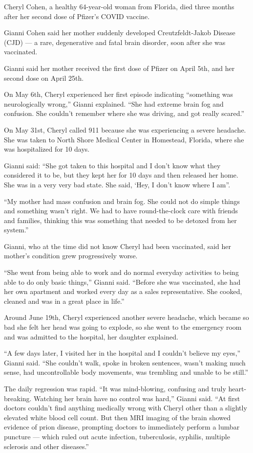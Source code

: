 Cheryl Cohen, a healthy 64-year-old woman from Florida, died three months after
her second dose of Pfizer’s COVID vaccine.

Gianni Cohen said her mother suddenly developed Creutzfeldt-Jakob Disease (CJD)
— a rare, degenerative and fatal brain disorder, soon after she was vaccinated.

Gianni said her mother received the first dose of Pfizer on April 5th, and her
second dose on April 25th.

On May 6th, Cheryl experienced her first episode indicating “something was
neurologically wrong,” Gianni explained. “She had extreme brain fog and
confusion. She couldn’t remember where she was driving, and got really scared.”

On May 31st, Cheryl called 911 because she was experiencing a severe
headache. She was taken to North Shore Medical Center in Homestead, Florida,
where she was hospitalized for 10 days.

Gianni said: “She got taken to this hospital and I don’t know what they
considered it to be, but they kept her for 10 days and then released her
home. She was in a very very bad state. She said, ‘Hey, I don’t know where I
am”.

“My mother had mass confusion and brain fog. She could not do simple things and
something wasn’t right. We had to have round-the-clock care with friends and
families, thinking this was something that needed to be detoxed from her
system.”

Gianni, who at the time did not know Cheryl had been vaccinated, said her
mother’s condition grew progressively worse.

“She went from being able to work and do normal everyday activities to being
able to do only basic things,” Gianni said. “Before she was vaccinated, she had
her own apartment and worked every day as a sales representative. She cooked,
cleaned and was in a great place in life.”

Around June 19th, Cheryl experienced another severe headache, which became so
bad she felt her head was going to explode, so she went to the emergency room
and was admitted to the hospital, her daughter explained.

“A few days later, I visited her in the hospital and I couldn’t believe my
eyes,” Gianni said. “She couldn’t walk, spoke in broken sentences, wasn’t making
much sense, had uncontrollable body movements, was trembling and unable to be
still.”

The daily regression was rapid. “It was mind-blowing, confusing and truly
heart-breaking. Watching her brain have no control was hard,” Gianni said. “At
first doctors couldn’t find anything medically wrong with Cheryl other than a
slightly elevated white blood cell count. But then MRI imaging of the brain
showed evidence of prion disease, prompting doctors to immediately perform a
lumbar puncture — which ruled out acute infection, tuberculosis, syphilis,
multiple sclerosis and other diseases.”

